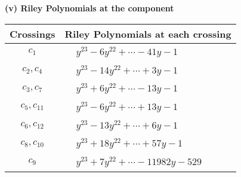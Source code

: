 \documentclass[1p]{elsarticle_modified}
\theoremstyle{definition}
\begin{document}
\newpage\renewcommand{\arraystretch}{1}
\flushleft \textbf{(v) Riley Polynomials at the component}\newline \\
\begin{tabular}{m{50pt}|m{274pt}}
Crossings & \hspace{64pt}Riley Polynomials at each crossing \\
\hline $$\begin{aligned}c_{1}\end{aligned}$$&$\begin{aligned}
&y^{23}-6 y^{22}+\cdots-41 y-1
\end{aligned}$\\
\hline $$\begin{aligned}c_{2},c_{4}\end{aligned}$$&$\begin{aligned}
&y^{23}-14 y^{22}+\cdots+3 y-1
\end{aligned}$\\
\hline $$\begin{aligned}c_{3},c_{7}\end{aligned}$$&$\begin{aligned}
&y^{23}+6 y^{22}+\cdots-13 y-1
\end{aligned}$\\
\hline $$\begin{aligned}c_{5},c_{11}\end{aligned}$$&$\begin{aligned}
&y^{23}-6 y^{22}+\cdots+13 y-1
\end{aligned}$\\
\hline $$\begin{aligned}c_{6},c_{12}\end{aligned}$$&$\begin{aligned}
&y^{23}-13 y^{22}+\cdots+6 y-1
\end{aligned}$\\
\hline $$\begin{aligned}c_{8},c_{10}\end{aligned}$$&$\begin{aligned}
&y^{23}+18 y^{22}+\cdots+57 y-1
\end{aligned}$\\
\hline $$\begin{aligned}c_{9}\end{aligned}$$&$\begin{aligned}
&y^{23}+7 y^{22}+\cdots-11982 y-529
\end{aligned}$\\
\hline
\end{tabular}\\~\\
\end{document}
